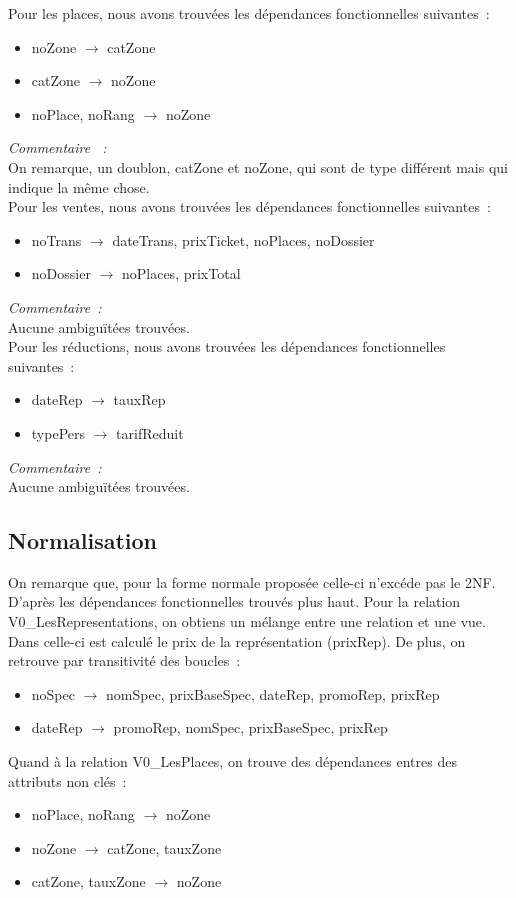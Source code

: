 \documentclass[a4paper, 10pt, twoside]{article}
\begin{document}
  \noindent Pour les places, nous avons trouvées les dépendances fonctionnelles suivantes~:
  \begin{itemize}
    \item noZone $\rightarrow$ catZone
    \item catZone $\rightarrow$ noZone
    \item noPlace, noRang $\rightarrow$ noZone
  \end{itemize}
  \emph{Commentaire ~:}\\
  On remarque, un doublon, catZone et noZone, qui sont de type différent mais qui indique la même chose.\\

  \noindent Pour les ventes, nous avons trouvées les dépendances fonctionnelles suivantes~:
  \begin{itemize}
    \item noTrans $\rightarrow$ dateTrans, prixTicket, noPlaces, noDossier
    \item noDossier $\rightarrow$ noPlaces, prixTotal
  \end{itemize}
  \emph{Commentaire~:}\\
  Aucune ambiguïtées trouvées.\\

  \noindent Pour les réductions, nous avons trouvées les dépendances fonctionnelles suivantes~:
  \begin{itemize}
    \item dateRep $\rightarrow$ tauxRep
    \item typePers $\rightarrow$ tarifReduit
  \end{itemize}
  \emph{Commentaire~:}\\
  Aucune ambiguïtées trouvées.\\

  \subsection{Normalisation}
  On remarque que, pour la forme normale proposée celle-ci n'excéde pas le 2NF. D'après les dépendances fonctionnelles
  trouvés plus haut. Pour la relation V0\_LesRepresentations, on obtiens un mélange entre une relation et une vue.
  Dans celle-ci est calculé le prix de la représentation (prixRep). De plus, on retrouve par transitivité des boucles~:
  \begin{itemize}
    \item noSpec $\rightarrow$ nomSpec, prixBaseSpec, dateRep, promoRep, prixRep
    \item dateRep $\rightarrow$ promoRep, nomSpec, prixBaseSpec, prixRep
  \end{itemize}
  Quand à la relation V0\_LesPlaces, on trouve des dépendances entres des attributs non clés~:
  \begin{itemize}
    \item noPlace, noRang $\rightarrow$ noZone
    \item noZone $\rightarrow$ catZone, tauxZone
    \item catZone, tauxZone $\rightarrow$ noZone
  \end{itemize}
\end{document}
